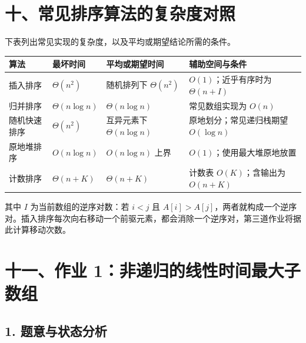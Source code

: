 \documentclass[
  UTF8,fontset=none,zihao=5]{ctexart}
\let\OldSection\section
\renewcommand{\section}{\Needspace{5\baselineskip}\OldSection}
\let\OldSubsection\subsection
\renewcommand{\subsection}{\Needspace{4\baselineskip}\OldSubsection}
\begin{document}
\hypertarget{ux5341ux5e38ux89c1ux6392ux5e8fux7b97ux6cd5ux7684ux590dux6742ux5ea6ux5bf9ux7167}{%
\section{十、常见排序算法的复杂度对照}\label{ux5341ux5e38ux89c1ux6392ux5e8fux7b97ux6cd5ux7684ux590dux6742ux5ea6ux5bf9ux7167}}

下表列出常见实现的复杂度，以及平均或期望结论所需的条件。

\begin{longtable}[]{@{}
  >{\raggedright\arraybackslash}p{}
  >{\raggedright\arraybackslash}p{}
  >{\raggedright\arraybackslash}p{}
  >{\raggedright\arraybackslash}p{}@{}}
\toprule
算法 & 最坏时间 & 平均或期望时间 & 辅助空间与条件 \\
\midrule
\endhead
插入排序 & \(\Theta(n^2)\) & 随机排列下 \(\Theta(n^2)\) &
\(O(1)\)；近乎有序时为 \(\Theta(n+I)\) \\
归并排序 & \(\Theta(n\log n)\) & \(\Theta(n\log n)\) & 常见数组实现为
\(O(n)\) \\
随机快速排序 & \(\Theta(n^2)\) & 互异元素下 \(\Theta(n\log n)\) &
原地划分；常见递归栈期望 \(O(\log n)\) \\
原地堆排序 & \(O(n\log n)\) & \(O(n\log n)\) 上界 &
\(O(1)\)；使用最大堆原地放置 \\
计数排序 & \(\Theta(n+K)\) & \(\Theta(n+K)\) & 计数表 \(O(K)\)；含输出为
\(O(n+K)\) \\
\bottomrule
\end{longtable}

其中 \(I\) 为当前数组的逆序对数：若 \(i<j\) 且
\(A[i]>A[j]\)，两者就构成一个逆序对。插入排序每次向右移动一个前驱元素，都会消除一个逆序对，第三道作业将据此计算移动次数。

\hypertarget{ux5341ux4e00ux4f5cux4e1a-1ux975eux9012ux5f52ux7684ux7ebfux6027ux65f6ux95f4ux6700ux5927ux5b50ux6570ux7ec4}{%
\section{十一、作业
1：非递归的线性时间最大子数组}\label{ux5341ux4e00ux4f5cux4e1a-1ux975eux9012ux5f52ux7684ux7ebfux6027ux65f6ux95f4ux6700ux5927ux5b50ux6570ux7ec4}}

\hypertarget{ux9898ux610fux4e0eux72b6ux6001ux5206ux6790}{%
\subsection{1.
题意与状态分析}\label{ux9898ux610fux4e0eux72b6ux6001ux5206ux6790}}
\end{document}
